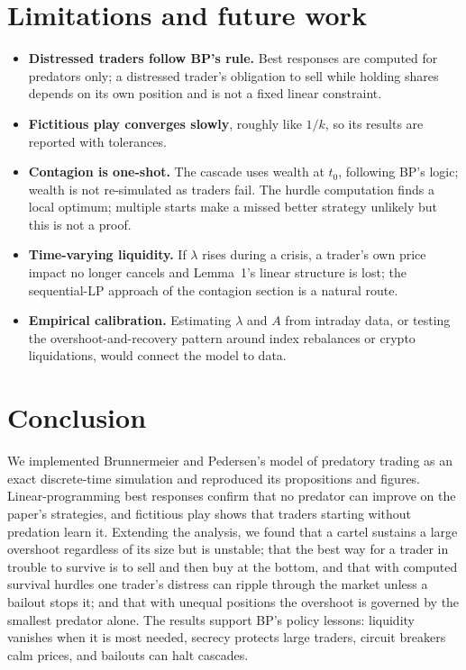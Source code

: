 \documentclass[11pt,a4paper]{article}
\begin{document}
\section{Limitations and future work}
\begin{itemize}
  \item \textbf{Distressed traders follow BP's rule.} Best responses are computed for
        predators only; a distressed trader's obligation to sell while holding shares
        depends on its own position and is not a fixed linear constraint.
  \item \textbf{Fictitious play converges slowly}, roughly like $1/k$, so its results are
        reported with tolerances.
  \item \textbf{Contagion is one-shot.} The cascade uses wealth at $t_0$, following BP's
        logic; wealth is not re-simulated as traders fail. The hurdle computation finds a
        local optimum; multiple starts make a missed better strategy unlikely but this is
        not a proof.
  \item \textbf{Time-varying liquidity.} If $\lambda$ rises during a crisis, a trader's own
        price impact no longer cancels and Lemma~1's linear structure is lost; the
        sequential-LP approach of the contagion section is a natural route.
  \item \textbf{Empirical calibration.} Estimating $\lambda$ and $A$ from intraday data, or
        testing the overshoot-and-recovery pattern around index rebalances or crypto
        liquidations, would connect the model to data.
\end{itemize}

\section{Conclusion}
We implemented Brunnermeier and Pedersen's model of predatory trading as an exact
discrete-time simulation and reproduced its propositions and figures. Linear-programming best
responses confirm that no predator can improve on the paper's strategies, and fictitious play
shows that traders starting without predation learn it. Extending the analysis, we found that
a cartel sustains a large overshoot regardless of its size but is unstable; that the best way
for a trader in trouble to survive is to sell and then buy at the bottom, and that with
computed survival hurdles one trader's distress can ripple through the market unless a
bailout stops it; and that with unequal positions the overshoot is governed by the smallest
predator alone. The results support BP's policy lessons: liquidity vanishes when it is most
needed, secrecy protects large traders, circuit breakers calm prices, and bailouts can halt
cascades.
\end{document}
